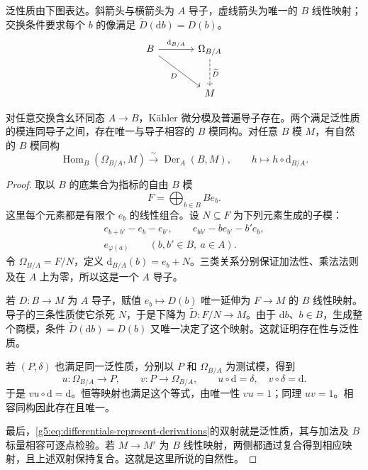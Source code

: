 泛性质由下图表达。斜箭头与横箭头为 \(A\) 导子，虚线箭头为唯一的 \(B\) 线性映射；交换条件要求每个 \(b\) 的像满足 \(\widetilde D(\mathrm{d}b)=D(b)\)。
\[
	\begin{tikzcd}[column sep=large,row sep=large]
		B\arrow[r,"\mathrm{d}_{B/A}"]\arrow[dr,"D"']&
		\Omega_{B/A}\arrow[d,dashed,"\widetilde D"]\\
		&M
	\end{tikzcd}
\]

\begin{proposition}\label{g5:prop:differentials-existence}
	对任意交换含幺环同态 \(A\to B\)，Kähler 微分模及普遍导子存在。两个满足泛性质的模连同导子之间，存在唯一与导子相容的 \(B\) 模同构。对任意 \(B\) 模 \(M\)，有自然的 \(B\) 模同构
	\begin{equation}\label{g5:eq:differentials-represent-derivations}
		\operatorname{Hom}_B(\Omega_{B/A},M)
		\xrightarrow{\ \sim\ }\operatorname{Der}_A(B,M),
		\qquad h\longmapsto h\circ\mathrm{d}_{B/A}.
	\end{equation}
\end{proposition}
\begin{proof}
	取以 \(B\) 的底集合为指标的自由 \(B\) 模
	\[
		F=\bigoplus_{b\in B}B e_b.
	\]
	这里每个元素都是有限个 \(e_b\) 的线性组合。设 \(N\subseteq F\) 为下列元素生成的子模：
	\[
		\begin{gathered}
			e_{b+b'}-e_b-e_{b'},\qquad
			e_{bb'}-b e_{b'}-b'e_b,\\
			e_{\varphi(a)}
			\qquad(b,b'\in B,\ a\in A).
		\end{gathered}
	\]
	令 \(\Omega_{B/A}=F/N\)，定义 \(\mathrm{d}_{B/A}(b)=e_b+N\)。三类关系分别保证加法性、乘法法则及在 \(A\) 上为零，所以这是一个 \(A\) 导子。

	若 \(D:B\to M\) 为 \(A\) 导子，赋值 \(e_b\mapsto D(b)\) 唯一延伸为 \(F\to M\) 的 \(B\) 线性映射。导子的三条性质使它杀死 \(N\)，于是下降为 \(\widetilde D:F/N\to M\)。由于 \(\mathrm{d}b\)、\(b\in B\)，生成整个商模，条件 \(\widetilde D(\mathrm{d}b)=D(b)\) 又唯一决定了这个映射。这就证明存在性与泛性质。

	若 \((P,\delta)\) 也满足同一泛性质，分别以 \(P\) 和 \(\Omega_{B/A}\) 为测试模，得到
	\[
		u:\Omega_{B/A}\to P,\qquad v:P\to\Omega_{B/A},
		\qquad u\circ\mathrm{d}=\delta,\quad v\circ\delta=\mathrm{d}.
	\]
	于是 \(vu\circ\mathrm{d}=\mathrm{d}\)。恒等映射也满足这个等式，由唯一性 \(vu=1\)；同理 \(uv=1\)。相容同构因此存在且唯一。

	最后，\eqref{g5:eq:differentials-represent-derivations}的双射就是泛性质，其与加法及 \(B\) 标量相容可逐点检验。若 \(M\to M'\) 为 \(B\) 线性映射，两侧都通过复合得到相应映射，且上述双射保持复合。这就是这里所说的自然性。
\end{proof}

